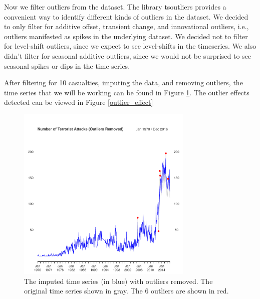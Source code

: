 \documentclass[11pt]{paper}
\begin{document}
Now we filter outliers from the dataset. The library tsoutliers provides a convenient way to identify different kinds of outliers in the dataset. We decided to only filter for additive offset, transient change, and innovational outliers, i.e., outliers manifested as spikes in the underlying dataset. We decided not to filter for level-shift outliers, since we expect to see level-shifts in the timeseries. We also didn’t filter for seasonal additive outliers, since we would not be surprised to see seasonal spikes or dips in the time series.

After filtering for 10 casualties, imputing the data, and removing outliers, the time series that we will be working can be found in Figure \ref{outlier}. The outlier effects detected can be viewed in Figure \ref{outlier_effect}

\begin{figure}
\centering
    \includegraphics[width=0.75\textwidth]{../image/outlier_comparison.pdf}
\caption{The imputed time series (in blue) with outliers removed. The original time series shown in gray. The 6 outliers are shown in red. }
\label{outlier}
\end{figure}
\end{document}
